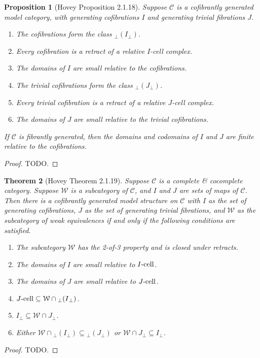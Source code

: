 \documentclass{amsart}
\theoremstyle{plain}
\newtheorem{theorem}{Theorem}[section]
\newtheorem{proposition}[theorem]{Proposition}
\theoremstyle{definition}
\newcommand{\sseq}{\subseteq}
\newcommand{\0}{\mathbf{0}}
\newcommand{\cC}{\mathcal C}
\newcommand{\p}{{_\perp}}
\newcommand{\cW}{\mathcal W}
\renewcommand{\(}{\left(}
\renewcommand{\)}{\right)}
\newcommand{\cell}{\text-\mathrm{cell}}
\begin{document}
\begin{proposition}[Hovey Proposition 2.1.18]\label{2.1.18}
  Suppose $\cC$ is a cofibrantly generated model category, with generating cofibrations $I$ and generating trivial fibrations $J$.\begin{enumerate}[label=(\alph*),noitemsep,topsep=0pt]
    \item The cofibrations form the class ${\p(I\p)}$.
    \item Every cofibration is a retract of a relative $I$-cell complex.
    \item The domains of $I$ are small relative to the cofibrations.
    \item The trivial cofibrations form the class ${\p(J\p)}$.
    \item Every trivial cofibration is a retract of a relative $J$-cell complex.
    \item The domains of $J$ are small relative to the trivial cofibrations.
  \end{enumerate}
  If $\cC$ is fibrantly generated, then the domains and codomains of $I$ and $J$ are finite relative to the cofibrations.
\end{proposition}
\begin{proof}
  \color{red}TODO.
\end{proof}

\begin{theorem}[Hovey Theorem 2.1.19]\label{2.1.19}
  Suppose $\cC$ is a complete \& cocomplete category. Suppose $\cW$ is a subcategory of $\cC$, and $I$ and $J$ are sets of maps of $\cC$. Then there is a cofibrantly generated model structure on $\cC$ with $I$ as the set of generating cofibrations, $J$ as the set of generating trivial fibrations, and $\cW$ as the subcategory of weak equivalences if and only if the following conditions are satisfied.\begin{enumerate}[label=\arabic*.,noitemsep,topsep=0pt]
    \item The subcategory $\cW$ has the 2-of-3 property and is closed under retracts.
    \item The domains of $I$ are small relative to $I\cell$.
    \item The domains of $J$ are small relative to $J\cell$.
    \item $J\cell\sseq\cW\cap {\p(I\p)}$.
    \item $I\p\sseq\cW\cap J\p$.
    \item Either $\cW\cap {\p(I\p)}\sseq {\p(J\p)}$ or $\cW\cap J\p\sseq I\p$.
  \end{enumerate}
\end{theorem}
\begin{proof}
  \color{red}TODO.
\end{proof}
\end{document}
